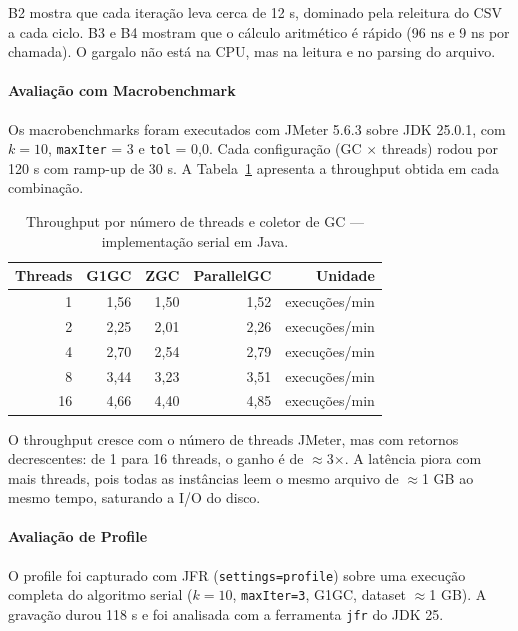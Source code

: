 B2 mostra que cada iteração leva cerca de 12 s, dominado pela releitura do CSV a cada
ciclo. B3 e B4 mostram que o cálculo aritmético é rápido (96 ns e 9 ns por chamada).
O gargalo não está na CPU, mas na leitura e no parsing do arquivo.

\paragraph{Avaliação com Macrobenchmark}

Os macrobenchmarks foram executados com JMeter 5.6.3 sobre JDK 25.0.1, com
\(k = 10\), \texttt{maxIter} = 3 e \texttt{tol} = 0,0. Cada configuração
(GC $\times$ threads) rodou por 120 s com ramp-up de 30 s. A
Tabela~\ref{tab:jmeter-serial-java} apresenta a throughput obtida em cada combinação.

\begin{table}[H]
\centering
\begin{tabular}{rrrrr}
\hline
\textbf{Threads} & \textbf{G1GC} & \textbf{ZGC} & \textbf{ParallelGC} & \textbf{Unidade} \\
\hline
1  & 1,56 & 1,50 & 1,52 & execuções/min \\
2  & 2,25 & 2,01 & 2,26 & execuções/min \\
4  & 2,70 & 2,54 & 2,79 & execuções/min \\
8  & 3,44 & 3,23 & 3,51 & execuções/min \\
16 & 4,66 & 4,40 & 4,85 & execuções/min \\
\hline
\end{tabular}
\caption{Throughput por número de threads e coletor de GC --- implementação serial em Java.}
\label{tab:jmeter-serial-java}
\end{table}

O throughput cresce com o número de threads JMeter, mas com retornos decrescentes:
de 1 para 16 threads, o ganho é de $\approx$3$\times$. A latência piora com mais
threads, pois todas as instâncias leem o mesmo arquivo de $\approx$1 GB ao mesmo
tempo, saturando a I/O do disco.

\paragraph{Avaliação de Profile}

O profile foi capturado com JFR (\texttt{settings=profile}) sobre uma execução completa
do algoritmo serial (\(k=10\), \texttt{maxIter=3}, G1GC, dataset $\approx$1 GB).
A gravação durou 118 s e foi analisada com a ferramenta \texttt{jfr} do JDK 25.

